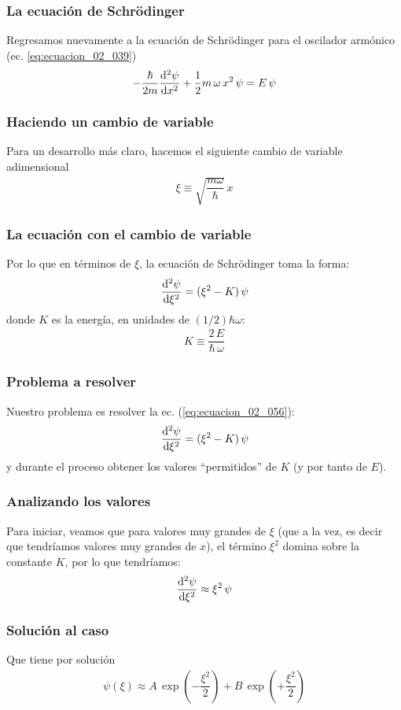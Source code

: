 \documentclass[12pt]{beamer}
\begin{document}
\begin{frame}
\frametitle{La ecuación de Schrödinger}
Regresamos nuevamente a la ecuación de Schrödinger para el oscilador armónico (ec. \ref{eq:ecuacion_02_039})
\begin{align*}
- \dfrac{\hbar}{2 m} \dv[2]{\psi}{x} + \dfrac{1}{2} m \, \omega \, x^{2} \, \psi = E \, \psi  
\end{align*}
\end{frame}
\begin{frame}
\frametitle{Haciendo un cambio de variable}
Para un desarrollo más claro, hacemos el siguiente cambio de variable adimensional
\begin{align}
\xi \equiv \sqrt{ \dfrac{m \omega}{\hbar}} \, x
    \label{eq:ecuacion_02_055}
\end{align}
\end{frame}
\begin{frame}
\frametitle{La ecuación con el cambio de variable}
Por lo que en términos de $\xi$, la ecuación de Schrödinger toma la forma:
\begin{align}
\dv[2]{\psi}{\xi} = (\xi^{2} - K) \, \psi
    \label{eq:ecuacion_02_056}
\end{align}
donde $K$ es la energía, \pause en unidades de $(1/2) \hbar \omega$:
\begin{align}
K \equiv \dfrac{2 \, E}{\hbar \, \omega}
    \label{eq:ecuacion_02_057}
\end{align}
\end{frame}
\begin{frame}
\frametitle{Problema a resolver}
Nuestro problema es resolver la ec. (\ref{eq:ecuacion_02_056}):
\begin{align*}
\dv[2]{\psi}{\xi} = (\xi^{2} - K) \, \psi
\end{align*}
\pause
y durante el proceso obtener los valores \enquote{permitidos} de $K$ (y por tanto de $E$).
\end{frame}
\begin{frame}
\frametitle{Analizando los valores}
Para iniciar, veamos que para valores muy grandes de $\xi$ (que a la vez, es decir que tendríamos valores muy grandes de $x$), el término $\xi^{2}$ domina sobre la constante $K$, por lo que tendríamos:
\pause
\begin{align}
\dv[2]{\psi}{\xi} \approx \xi^{2} \, \psi
    \label{eq:ecuacion_02_058}
\end{align}
\end{frame}
\begin{frame}
\frametitle{Solución al caso}
Que tiene por solución
\begin{align}
\psi (\xi) \approx A \, \exp \left( - \dfrac{\xi^{2}}{2} \right) + B \, \exp \left( + \dfrac{\xi^{2}}{2} \right)
    \label{eq:ecuacion_02_059}
\end{align}
\end{frame}
\end{document}
